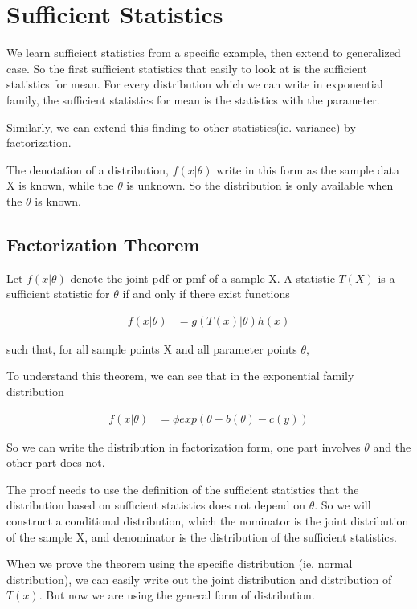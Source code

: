 

\section{Sufficient Statistics}
We learn sufficient statistics from a specific example, then extend to generalized case. So the first sufficient statistics that easily to look at is the sufficient statistics for mean. For every distribution which we can write in exponential family, the sufficient statistics for mean is the statistics with the parameter. 

Similarly, we can extend this finding to other statistics(ie. variance) by factorization.

The denotation of a distribution, $f(x | \theta)$ write in this form as the sample data X is known, while the $\theta$ is unknown. So the distribution is only available when the $\theta$ is known. 

\subsection{Factorization Theorem}

Let  $f(x | \theta)$ denote the joint pdf or pmf of a sample X. A statistic $T(X)$ is a sufficient statistic for $\theta$ if and only if there exist functions  

\begin{align*}
	f(x | \theta) &=g(T(x)| \theta) h(x)
\end{align*}

such that, for all sample points X and all parameter points  $\theta$,


To understand this theorem, we can see that in the exponential family distribution

\begin{align*}
	f(x | \theta) &= \phi exp( \theta - b(\theta) - c(y))
\end{align*}

So we can write the distribution in factorization form, one part involves $\theta$ and the other part does not.


The proof needs to use the definition of the sufficient statistics that the distribution based on sufficient statistics does not depend on $\theta$. So we will construct a conditional distribution, which the nominator is the joint distribution of the sample X, and denominator is the distribution of the sufficient statistics.

When we prove the theorem using the specific distribution (ie. normal distribution), we can easily write out the joint distribution and distribution of $T(x)$. But now we are using the general form of distribution.

